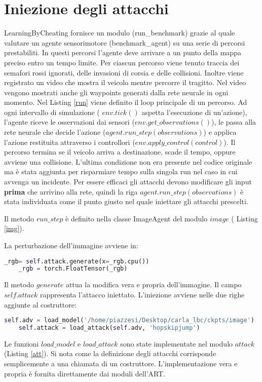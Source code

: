 \section{Iniezione degli attacchi}
LearningByCheating fornisce un modulo (run\_benchmark) grazie al quale valutare un agente sensorimotore (benchmark\_agent) su una serie di percorsi prestabiliti.
In questi percorsi l'agente deve arrivare a un punto della mappa preciso entro un tempo limite. Per ciascun percorso viene tenuto traccia dei semafori rossi ignorati, delle invasioni di corsia e delle collisioni. Inoltre viene registrato un video che mostra il veicolo mentre percorre il tragitto.
Nel video vengono mostrati anche gli waypoints generati dalla rete neurale in ogni momento. Nel Listing \ref{run} viene definito il loop principale di un percorso.
Ad ogni intervallo di simulazione ( $env.tick()$ aspetta l'esecuzione di un'azione),  l'agente riceve le osservazioni dai sensori ($env.get\_observations()$), le passa alla 
rete neurale che decide l'azione ($agent.run\_step(observations)$) e applica l'azione restituita attraverso i controllori ($env.apply\_control(control)$). Il percorso termina 
se il veicolo arriva a destinazione, scade il tempo, oppure avviene una collisione. L'ultima condizione non era presente nel codice originale ma è stata aggiunta per risparmiare tempo sulla singola run nel caso in cui avvenga un incidente. Per essere efficaci gli attacchi devono modificare gli input 
\textbf{prima} che arrivino alla rete, quindi la riga $agent.run\_step(observations)$ è stata individuata come il punto giusto nel quale iniettare gli attacchi prescelti.

Il metodo $run\_step$ è definito nella classe ImageAgent del  modulo $image$ ( Listing \ref{img}).

La perturbazione dell'immagine avviene in:
\begin{lstlisting}[language=Python]
    _rgb= self.attack.generate(x=_rgb.cpu())
    _rgb = torch.FloatTensor(_rgb)
\end{lstlisting}
Il metodo $generate$ attua la modifica vera e propria dell'immagine. Il campo $self.attack$ rappresenta l'attacco iniettato. L'iniezione avviene nelle due righe aggiunte al costruttore:
\begin{lstlisting}[language=Python]
    self.adv = load_model('/home/piazzesi/Desktop/carla_lbc/ckpts/image')
    self.attack = load_attack(self.adv, 'hopskipjump')
\end{lstlisting}
Le funzioni $load\_model$ e $load\_attack$ sono state implementate nel modulo $attack$ (Listing \ref{att}). Si nota come la definizione  degli attacchi corrisponde semplicemente a una chiamata
di un costruttore. L'implementazione vera e propria  è fornita direttamente dai moduli dell'ART.

